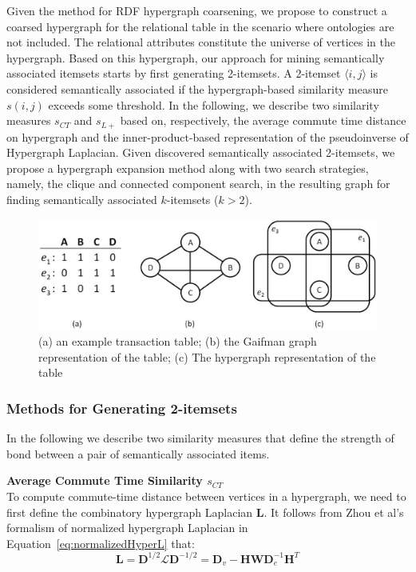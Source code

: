Given the method for RDF hypergraph coarsening, we propose to construct a coarsed hypergraph for the relational table in the scenario where ontologies are not included. The relational attributes constitute the universe of vertices in the hypergraph. Based on this hypergraph, our approach for mining semantically associated itemsets starts by first generating 2-itemsets. A 2-itemset $\langle i,j \rangle$ is considered semantically associated if the hypergraph-based similarity measure $s(i,j)$ exceeds some threshold. In the following, we describe two similarity measures $s_{CT}$ and $s_{L+}$ based on, respectively, the average commute time distance on hypergraph and the inner-product-based representation of the pseudoinverse of Hypergraph Laplacian. Given discovered semantically associated 2-itemsets, we propose a hypergraph expansion method along with two search strategies, namely, the clique and connected component search, in the resulting graph for finding semantically associated $k$-itemsets ($k>2$).
\begin{figure}[tbh]
\begin{center}
\includegraphics[width=.8\textwidth]{fig/hg_and_rg1.eps}
\end{center}
\caption{\label{fig:hg_and_rg} (a) an example transaction table; (b) the Gaifman graph representation of the table; (c) The hypergraph representation of the table}
\end{figure}

\subsubsection{Methods for Generating 2-itemsets}
In the following we describe two similarity measures that define the strength of bond between a pair of semantically associated items.

\textbf{Average Commute Time Similarity $s_{CT}$}\\
To compute commute-time distance between vertices in a hypergraph, we need to first define the combinatory hypergraph Laplacian $\mathbf{L}$.
It follows from Zhou et al's formalism of normalized hypergraph Laplacian in Equation~\ref{eq:normalizedHyperL} that:
\begin{equation}
\mathbf{L}=\mathbf{D}^{1/2}\mathcal{L}\mathbf{D}^{-1/2}=\mathbf{D}_v-\mathbf{HWD}_e^{-1}\mathbf{H}^T \label{eq:combinatoryHyperL}
\end{equation}

